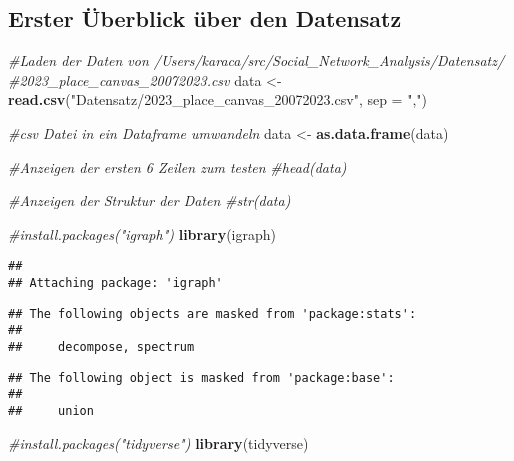 \documentclass[
]{article}
\newenvironment{Shaded}{\begin{snugshade}}{\end{snugshade}}
\newcommand{\AttributeTok}[1]{\textcolor[rgb]{0.13,0.29,0.53}{#1}}
\newcommand{\CommentTok}[1]{\textcolor[rgb]{0.56,0.35,0.01}{\textit{#1}}}
\newcommand{\FunctionTok}[1]{\textcolor[rgb]{0.13,0.29,0.53}{\textbf{#1}}}
\newcommand{\NormalTok}[1]{#1}
\newcommand{\OtherTok}[1]{\textcolor[rgb]{0.56,0.35,0.01}{#1}}
\newcommand{\StringTok}[1]{\textcolor[rgb]{0.31,0.60,0.02}{#1}}
\begin{document}
\subsection{Erster Überblick über den
Datensatz}\label{erster-uxfcberblick-uxfcber-den-datensatz}

\begin{Shaded}
\begin{Highlighting}[]
\CommentTok{\#Laden der Daten von  /Users/karaca/src/Social\_Network\_Analysis/Datensatz/}
                        \CommentTok{\#2023\_place\_canvas\_20072023.csv}
\NormalTok{data }\OtherTok{\textless{}{-}} \FunctionTok{read.csv}\NormalTok{(}\StringTok{"Datensatz/2023\_place\_canvas\_20072023.csv"}\NormalTok{, }\AttributeTok{sep =} \StringTok{","}\NormalTok{)}

\CommentTok{\#csv Datei in ein Dataframe umwandeln}
\NormalTok{data }\OtherTok{\textless{}{-}} \FunctionTok{as.data.frame}\NormalTok{(data)}

\CommentTok{\#Anzeigen der ersten 6 Zeilen zum testen}
\CommentTok{\#head(data)}

\CommentTok{\#Anzeigen der Struktur der Daten}
\CommentTok{\#str(data)}
\end{Highlighting}
\end{Shaded}

\begin{Shaded}
\begin{Highlighting}[]
\CommentTok{\#install.packages("igraph")}
\FunctionTok{library}\NormalTok{(igraph)}
\end{Highlighting}
\end{Shaded}

\begin{verbatim}
## 
## Attaching package: 'igraph'
\end{verbatim}

\begin{verbatim}
## The following objects are masked from 'package:stats':
## 
##     decompose, spectrum
\end{verbatim}

\begin{verbatim}
## The following object is masked from 'package:base':
## 
##     union
\end{verbatim}

\begin{Shaded}
\begin{Highlighting}[]
\CommentTok{\#install.packages("tidyverse")}
\FunctionTok{library}\NormalTok{(tidyverse)}
\end{Highlighting}
\end{Shaded}
\end{document}
